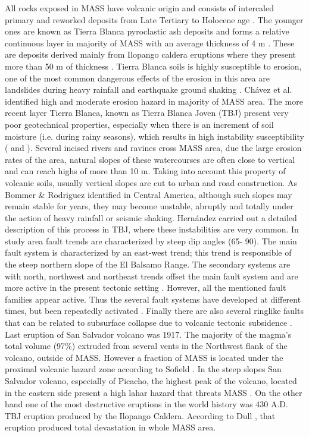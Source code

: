 \documentclass[11pt,twoside]{rmta2010esp}%
\begin{document}
All rocks exposed in MASS have volcanic origin and consists of intercaled primary and reworked deposits from Late Tertiary to Holocene age \cite{schmidt1975}. The younger ones are known as Tierra Blanca pyroclastic ash deposits and forms a relative continuous layer in majority of MASS with an average thickness of 4 m \cite{schmidt1975}. These are deposits derived mainly from Ilopango caldera eruptions where they present more than 50 m of thickness \cite{schmidt1975}. Tierra Blanca soils is highly susceptible to erosion, one of the most common dangerous effects of the erosion in this area are landslides during heavy rainfall and earthquake ground shaking \cite{schmidt1975}. Ch\'{a}vez et al. \cite{chavez2014a} identified high and moderate erosion hazard in majority of MASS area. The more recent layer Tierra Blanca, known as Tierra Blanca Joven (TBJ) \cite{hernan2004} present very poor geotechnical properties, especially when there is an increment of soil moisture (i.e. during rainy seasons), which results in high instability susceptibility (\cite{chavez2014b} and \cite{rolo2004}). Several incised rivers and ravines cross MASS area, due the large erosion rates of the area, natural slopes of these watercourses are often close to vertical and can reach highs of more than 10 m. Taking into account this property of volcanic soils, usually vertical slopes are cut to urban and road construction. As Bommer \& Rodriguez \cite{bommer} identified in Central America, although such slopes may remain stable for years, they may become unstable, abruptly and totally under the action of heavy rainfall or seismic shaking. Hern\'{a}ndez \cite{hernan2004} carried out a detailed description of this process in TBJ, where these instabilities are very common. 
In study area fault trends are characterized by steep dip angles (65\textdegree - 90\textdegree). The main fault system is characterized by an east-west trend; this trend is responsible of the steep northern slope of the El Balsamo Range.  The secondary systems are with north, northwest and northeast trends offset the main fault system and are more active in the present tectonic setting \cite{schmidt1975}. However, all the mentioned fault families appear active. Thus the several fault systems have developed at different times, but been repeatedly activated \cite{rymer1987}. Finally there are also several ringlike faults that can be related to subsurface collapse due to volcanic tectonic subsidence \cite{schmidt1975}.
Last eruption of San Salvador volcano was 1917.  The majority of the magma's total volume (97\%) extruded from several vents in the Northwest flank of the volcano, outside of MASS. However a fraction of MASS is located under the proximal volcanic hazard zone according to Sofield \cite{sofield2004}. In the steep slopes  San Salvador volcano, especially of Picacho, the highest peak of the volcano, located in the eastern side present a high lahar hazard that threats MASS \cite{major2004}. On the other hand one of the most destructive eruptions in the world history was 430 A.D. TBJ eruption produced by the Ilopango Caldera. According to Dull \cite{dull2004}, that eruption produced total devastation in whole MASS area. 
\end{document}
